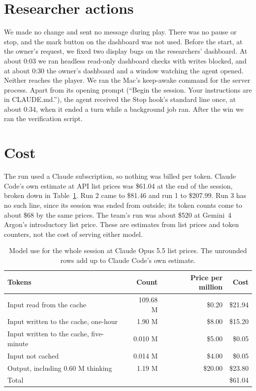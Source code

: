 \documentclass[11pt,a4paper]{article}
\begin{document}
\section{Researcher actions}
\label{sec:actions}

We made no change and sent no message during play. There was no pause or stop, and the mark button on the dashboard was not used. Before the start, at the owner's request, we fixed two display bugs on the researchers' dashboard. At about 0:03 we ran headless read-only dashboard checks with writes blocked, and at about 0:30 the owner's dashboard and a window watching the agent opened. Neither reaches the player. We ran the Mac's keep-awake command for the server process. Apart from its opening prompt (``Begin the session. Your instructions are in CLAUDE.md.''), the agent received the Stop hook's standard line once, at about 0:34, when it ended a turn while a background job ran. After the win we ran the verification script.

\section{Cost}
\label{sec:cost}

The run used a Claude subscription, so nothing was billed per token. Claude Code's own estimate at API list prices was \$61.04 at the end of the session, broken down in Table~\ref{tab:cost}. Run 2 came to \$81.46 and run 1 to \$207.99. Run 3 has no such line, since its session was ended from outside; its token counts come to about \$68 by the same prices. The team's run was about \$520 at Gemini~4 Argon's introductory list price. These are estimates from list prices and token counters, not the cost of serving either model.

\begin{table}[t]
  \caption{Model use for the whole session at Claude Opus 5.5 list prices. The unrounded rows add up to Claude Code's own estimate.}
  \label{tab:cost}
  \small
  \begin{tabularx}{\textwidth}{@{}Xrrr@{}}
    \toprule
    \textbf{Tokens} & \textbf{Count} & \textbf{Price per million} & \textbf{Cost} \\
    \midrule
    Input read from the cache & 109.68 M & \$0.20 & \$21.94 \\
    Input written to the cache, one-hour & 1.90 M & \$8.00 & \$15.20 \\
    Input written to the cache, five-minute & 0.010 M & \$5.00 & \$0.05 \\
    Input not cached & 0.014 M & \$4.00 & \$0.05 \\
    Output, including 0.60 M thinking & 1.19 M & \$20.00 & \$23.80 \\
    \midrule
    Total & & & \$61.04 \\
    \bottomrule
  \end{tabularx}
\end{table}
\end{document}
